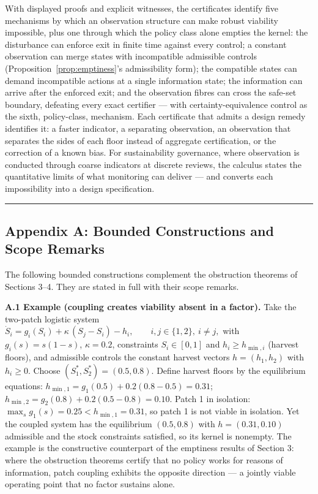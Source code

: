 \documentclass[11pt]{article}
\theoremstyle{definition}
\begin{document}
With displayed proofs and explicit witnesses, the certificates identify
five mechanisms by which an observation structure can make robust
viability impossible, plus one through which the policy class alone
empties the kernel: the disturbance can enforce exit in finite time
against every control; a constant observation can merge states with
incompatible admissible controls (Proposition~\ref{prop:emptiness}'s admissibility form);
the compatible states can demand incompatible actions at a single
information state; the information can arrive after the enforced exit;
and the observation fibres can cross the safe-set boundary, defeating
every exact certifier --- with certainty-equivalence control as the
sixth, policy-class, mechanism. Each certificate that admits a design
remedy identifies it: a faster indicator, a separating observation, an
observation that separates the sides of each floor instead of aggregate
certification, or the correction of a known bias. For sustainability
governance, where observation is conducted through coarse indicators at
discrete reviews, the calculus states the quantitative limits of what
monitoring can deliver --- and converts each impossibility into a design
specification.

\begin{center}\rule{0.5\linewidth}{0.5pt}\end{center}

\subsection{Appendix A: Bounded Constructions and Scope
Remarks}\label{appendix-a-bounded-constructions-and-scope-remarks}

The following bounded constructions complement the obstruction theorems
of Sections 3--4. They are stated in full with their scope remarks.

\textbf{A.1 Example (coupling creates viability absent in a factor).}
Take the two-patch logistic system
\(\dot S_i = g_i(S_i) + \kappa\,(S_j - S_i) - h_i, \qquad i, j \in \{1,2\},\ i \ne j,\)
with \(g_i(s) = s(1-s)\), \(\kappa = 0.2\), constraints \(S_i \in [0,1]\) and \(h_i \ge h_{\min,i}\) (harvest floors), and admissible controls the constant harvest vectors \(h = (h_1, h_2)\) with \(h_i \ge 0\). Choose
\((S_1^*, S_2^*) = (0.5, 0.8)\). Define harvest floors by the equilibrium equations: \(h_{\min,1} = g_1(0.5) + 0.2(0.8 - 0.5) = 0.31\); \(h_{\min,2} = g_2(0.8) + 0.2(0.5 - 0.8) = 0.10\). Patch 1 in isolation:
\(\max_s g_1(s) = 0.25 < h_{\min,1} = 0.31\), so patch 1 is not viable
in isolation. Yet the coupled system has the equilibrium \((0.5, 0.8)\)
with \(h = (0.31, 0.10)\) admissible and the stock constraints
satisfied, so its kernel is nonempty. The example is the constructive
counterpart of the emptiness results of Section 3: where the obstruction
theorems certify that no policy works for reasons of information, patch
coupling exhibits the opposite direction --- a jointly viable operating
point that no factor sustains alone.
\end{document}
